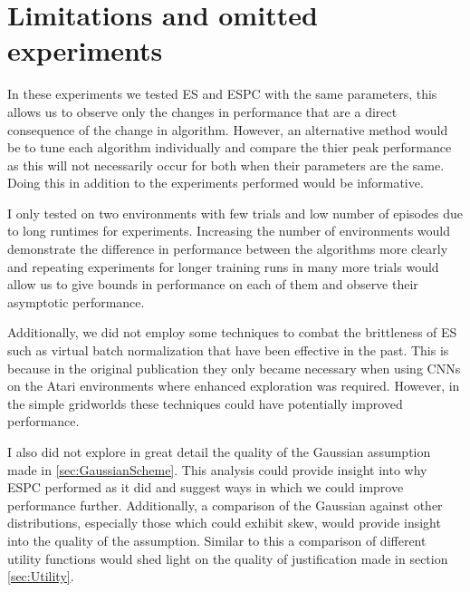 \section{Limitations and omitted experiments}
In these experiments we tested ES and ESPC with the same parameters, this allows us to observe only the changes in performance that are a direct consequence of the change in algorithm. However, an alternative method would be to tune each algorithm individually and compare the thier peak performance as this will not necessarily occur for both when their parameters are the same. Doing this in addition to the experiments performed would be informative.

I only tested on two environments with few trials and low number of episodes due to long runtimes for experiments. Increasing the number of environments would demonstrate the difference in performance between the algorithms more clearly and repeating experiments for longer training runs in many more trials would allow us to give bounds in performance on each of them and observe their asymptotic performance.

Additionally, we did not employ some techniques to combat the brittleness of ES such as virtual batch normalization that have been effective in the past. This is because in the original publication they only became necessary when using CNNs on the Atari environments where enhanced exploration was required. However, in the simple gridworlds these techniques could have potentially improved performance.

I also did not explore in great detail the quality of the Gaussian assumption made in \ref{sec:GaussianScheme}. This analysis could provide insight into why ESPC performed as it did and suggest ways in which we could improve performance further. Additionally, a comparison of the Gaussian against other distributions, especially those which could exhibit skew, would provide insight into the quality of the assumption. Similar to this a comparison of different utility functions would shed light on the quality of justification made in section \ref{sec:Utility}.


    


